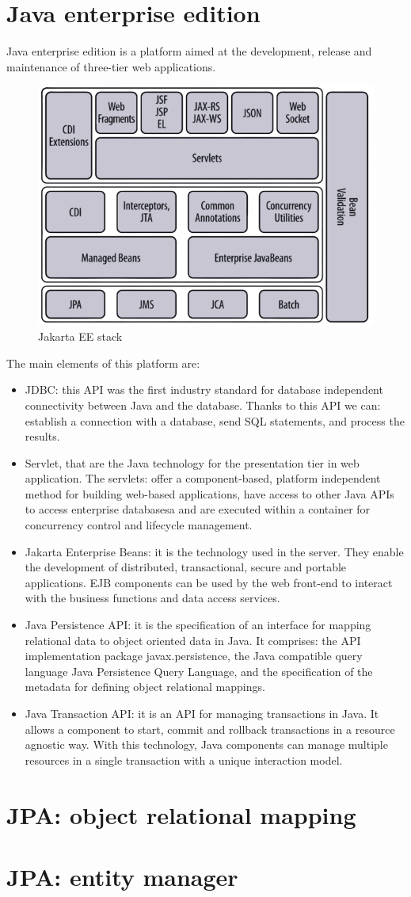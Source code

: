 \documentclass[12pt, a4paper]{report}
\newtheorem[style=M,bodystyle=\normalfont]{theorem}{Theorem}
\newtheorem[style=M,bodystyle=\normalfont]{corollary}{Corollary}
\newtheorem[style=M,bodystyle=\normalfont]{lemma}{Lemma}
\newtheorem[style=M,bodystyle=\normalfont]{definition}{Definition}
\begin{document}
    \section{Java enterprise edition}
    Java enterprise edition is a platform aimed at the development, release and maintenance of three-tier web applications.
    \begin{figure}[H]
        \centering
        \includegraphics[width=0.5\linewidth]{images/jee.png}
        \caption{Jakarta EE stack}
    \end{figure}
    The main elements of this platform are: 
    \begin{itemize}
        \item JDBC: this API was the first industry standard for database independent connectivity between Java and the database. Thanks to this API we can:
            establish a connection with a database, send SQL statements, and process the results. 
        \item Servlet, that are the Java technology for the presentation tier in web application. The servlets: 
            offer a component-based, platform independent method for building web-based applications, have access to other Java APIs to access enterprise databasesa 
            and are executed within a container for concurrency control and lifecycle management. 
        \item Jakarta Enterprise Beans: it is the technology used in the server. They enable the development of distributed, transactional, secure and portable applications. 
            EJB components can be used by the web front-end to interact with the business functions and data access services. 
        \item Java Persistence API: it is the specification of an interface for mapping relational data to object oriented data in Java. 
            It comprises: the API implementation package javax.persistence, the Java compatible query language Java Persistence Query Language, and the specification of the metadata for defining object
            relational mappings. 
        \item Java Transaction API: it is an API for managing transactions in Java. It allows a component to start, commit and rollback transactions in a resource agnostic way. 
            With this technology, Java components can manage multiple resources in a single transaction with a unique interaction model.
    \end{itemize}

    \section{JPA: object relational mapping}

    
    \section{JPA: entity manager}
    




    
\end{document}
